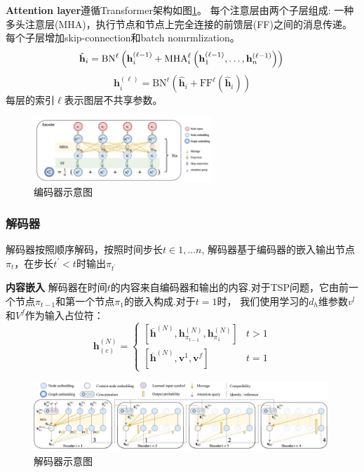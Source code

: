 \documentclass{whutmod}
\begin{document}
\textbf{Attention layer}\quad 遵循Transformer架构如图\ref{fig:encoder}。 每个注意层由两个子层组成: 一种多头注意层(MHA)，执行节点和节点上完全连接的前馈层(FF)之间的消息传递。每个子层增加skip-connection和batch nomrmlization。
\begin{equation}
\hat{\mathbf{h}}_{i} =\mathrm{B} \mathrm{N}^{\ell}\left(\mathbf{h}_{i}^{(\ell-1)}+\mathrm{MHA}_{i}^{\ell}\left(\mathbf{h}_{1}^{(\ell-1)}, \ldots, \mathbf{h}_{n}^{(\ell-1)}\right)\right) \\
\end{equation}
\begin{equation}
\mathbf{h}_{i}^{(\ell)} =\mathrm{B} \mathrm{N}^{\ell}\left(\hat{\mathbf{h}}_{i}+\mathrm{FF}^{\ell}\left(\hat{\mathbf{h}}_{i}\right)\right)
\end{equation}
每层的索引$\ell$表示图层不共享参数。
\begin{figure}[!h]
	\centering
	\includegraphics[width=0.6\textwidth]{encoder.jpg}
	\caption{编码器示意图}
	\label{fig:encoder}
\end{figure}

\subsubsection{解码器}
解码器按照顺序解码，按照时间步长$t\in {1,...n}$, 解码器基于编码器的嵌入输出节点$\pi_{t}$，在步长$t^{\prime}<t$时输出$\pi_{t^{\prime}}$

\textbf{内容嵌入}\quad
解码器在时间$t$的内容来自编码器和输出的内容.对于TSP问题，它由前一个节点$\pi_{t-1}$和第一个节点$\pi_{1}$的嵌入构成.对于$t=1$时， 我们使用学习的$d_{h}$维参数$v^{l}$和$V^{f}$作为输入占位符：
\begin{equation}\mathbf{h}_{(c)}^{(N)}=\left\{\begin{array}{ll}
{\left[\overline{\mathbf{h}}^{(N)}, \mathbf{h}_{\pi_{t-1}}^{(N)}, \mathbf{h}_{\pi_{1}}^{(N)}\right]} & t>1 \\
{\left[\overline{\mathbf{h}}^{(N)}, \mathbf{v}^{1}, \mathbf{v}^{f}\right]} & t=1
\end{array}\right.\end{equation}

\begin{figure}[!h]
	\centering
	\includegraphics[width=0.99\textwidth]{decoder.jpg}
	\caption{解码器示意图}
	\label{fig:decoder}
\end{figure}
\end{document}
